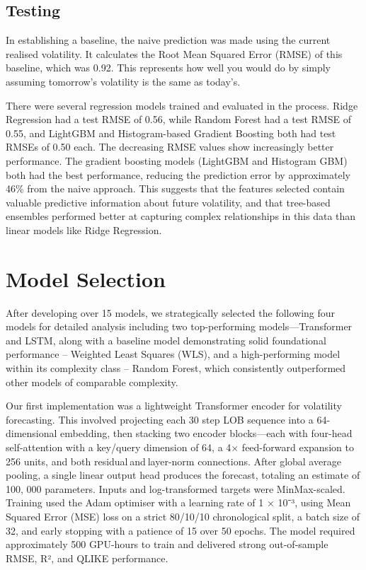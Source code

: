 \documentclass[
  letterpaper,
  DIV=11,
  numbers=noendperiod]{scrartcl}
\begin{document}
\subsection{Testing}\label{testing}

In establishing a baseline, the naive prediction was made using the
current realised volatility. It calculates the Root Mean Squared Error
(RMSE) of this baseline, which was 0.92. This represents how well you
would do by simply assuming tomorrow's volatility is the same as
today's.

There were several regression models trained and evaluated in the
process. Ridge Regression had a test RMSE of 0.56, while Random Forest
had a test RMSE of 0.55, and LightGBM and Histogram-based Gradient
Boosting both had test RMSEs of 0.50 each. The decreasing RMSE values
show increasingly better performance. The gradient boosting models
(LightGBM and Histogram GBM) both had the best performance, reducing the
prediction error by approximately 46\% from the naive approach. This
suggests that the features selected contain valuable predictive
information about future volatility, and that tree-based ensembles
performed better at capturing complex relationships in this data than
linear models like Ridge Regression.

\section{Model Selection}\label{model-selection}

After developing over 15 models, we strategically selected the following
four models for detailed analysis including two top-performing
models---Transformer and LSTM, along with a baseline model demonstrating
solid foundational performance -- Weighted Least Squares (WLS), and a
high-performing model within its complexity class -- Random Forest,
which consistently outperformed other models of comparable complexity.

Our first implementation was a lightweight Transformer encoder for
volatility forecasting. This involved projecting each 30 step LOB
sequence into a 64-dimensional embedding, then stacking two encoder
blocks---each with four-head self-attention with a key/query dimension
of 64, a 4× feed-forward expansion to 256 units, and both
residual and layer-norm connections. After global average pooling, a
single linear output head produces the forecast, totaling an estimate of
100, 000 parameters. Inputs and log-transformed targets were
MinMax-scaled. Training used the Adam optimiser with a learning rate of
1 × 10⁻³, using Mean Squared Error (MSE) loss on a strict 80/10/10
chronological split, a batch size of 32, and early stopping with a
patience of 15 over 50 epochs. The model required approximately 500
GPU-hours to train and delivered strong out-of-sample RMSE, R², and
QLIKE performance.
\end{document}
